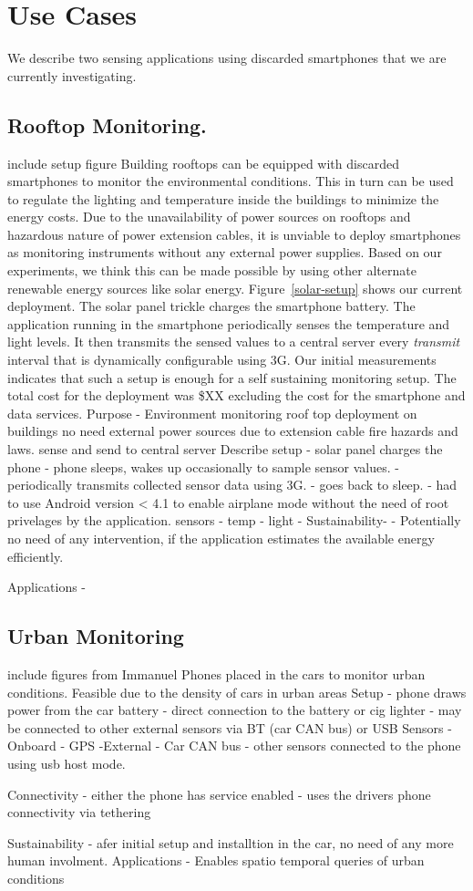 \section{Use Cases}
\label{sec-usecases}
We describe two sensing applications using discarded smartphones that we are
currently investigating.
\subsection{Rooftop Monitoring.}
include setup figure
Building rooftops can be equipped with discarded smartphones to monitor the
environmental conditions. This in turn can be used to regulate the lighting and
temperature inside the buildings to minimize the energy costs.
Due to the unavailability of power sources on rooftops and hazardous nature of
power extension cables, it is unviable to deploy smartphones as monitoring
instruments without any external power supplies.
Based on our experiments, we think this can be made possible by using other
alternate renewable energy sources like solar energy.
Figure~\ref{solar-setup} shows our current deployment. The solar panel trickle
charges the smartphone battery. The application running in the smartphone
periodically senses the temperature and light levels. It then transmits the
sensed values to a central server every \textit{transmit} interval that is dynamically
configurable using 3G. Our initial measurements indicates that such a setup is
enough for a self sustaining monitoring setup. The total cost for the
deployment was \$XX excluding the cost for the smartphone and data services.
Purpose - 
 Environment monitoring
 roof top deployment on buildings
 no need external power sources due to extension cable fire hazards and laws.
 sense and send to central server
Describe setup 
 - solar panel charges the phone
 - phone sleeps, wakes up occasionally to sample sensor values.
 - periodically transmits collected sensor data using 3G.
 - goes back to sleep.
 - had to use Android version < 4.1 to enable airplane mode without the need of
 root privelages by the application.
sensors
  - temp
  - light
  - 
Sustainability-
  - Potentially no need of any intervention, if the application estimates the
  available energy efficiently.

Applications
 - 

\subsection{Urban Monitoring}
include figures from Immanuel
  Phones placed in the cars to monitor urban conditions.
  Feasible due to the density of cars in urban areas
  Setup
   - phone draws power from the car battery
    - direct connection to the battery or cig lighter
    - may be connected to other external sensors via BT (car CAN bus) or USB
  Sensors
   - Onboard 
    - GPS
   -External 
    - Car CAN bus
    - other sensors connected to the phone using usb host mode.

  Connectivity
   - either the phone has service enabled
   - uses the drivers phone connectivity via tethering
  
  Sustainability
  - afer initial setup and installtion in the car, no need of any more human
  involment.
  Applications
   - Enables spatio temporal queries of urban conditions


